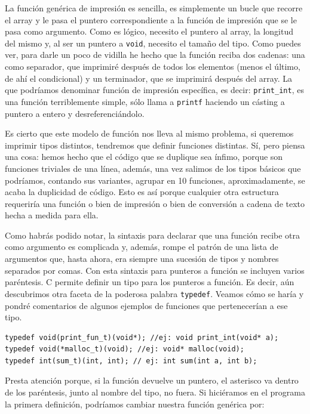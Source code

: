 \documentclass[a4paper]{article}
\begin{document}
La función genérica de impresión es sencilla, es simplemente un bucle que
recorre el array y le pasa el puntero correspondiente a la función de impresión
que se le pasa como argumento. Como es lógico, necesito el puntero al array,
la longitud del mismo y, al ser un puntero a \verb!void!, necesito el tamaño
del tipo. Como puedes ver, para darle un poco de vidilla he hecho que la
función reciba dos cadenas: una como separador, que imprimiré después de
todos los elementos (menos el último, de ahí el condicional) y un terminador,
que se imprimirá después del array. La que podríamos denominar función
de impresión específica, es decir: \verb!print_int!, es una función terriblemente
simple, sólo llama a \verb!printf! haciendo un cásting a puntero a entero
y desreferenciándolo.

Es cierto que este modelo de función nos lleva al mismo problema, si
queremos imprimir tipos distintos, tendremos que definir funciones distintas.
Sí, pero piensa una cosa: hemos hecho que el código que se duplique sea ínfimo,
porque son funciones triviales de una línea, además, una vez salimos de los
tipos básicos que podríamos, contando sus variantes, agrupar en 10 funciones,
aproximadamente, se acaba la duplicidad de código. Esto es así porque cualquier
otra estructura requeriría una función o bien de impresión o bien de conversión
a cadena de texto hecha a medida para ella.

Como habrás podido notar, la sintaxis para declarar que una función recibe
otra como argumento es complicada y, además, rompe el patrón de una lista
de argumentos que, hasta ahora, era siempre una sucesión de tipos y nombres
separados por comas. Con esta sintaxis para punteros a función se
incluyen varios paréntesis. C permite definir un tipo para los punteros
a función. Es decir, aún descubrimos otra faceta de la poderosa palabra
\verb!typedef!. Veamos cómo se haría y pondré comentarios de algunos ejemplos
de funciones que pertenecerían a ese tipo.

\noindent
\begin{minipage}[H]{\linewidth}
\mbox{}
\begin{lstlisting}[style=C,
caption={Definición de tipos puntero a función},
label={lst:functionPointerTypedef}]
typedef void(print_fun_t)(void*); //ej: void print_int(void* a);
typedef void(*malloc_t)(void); //ej: void* malloc(void);
typedef int(sum_t)(int, int); // ej: int sum(int a, int b);
\end{lstlisting}
\end{minipage}
Presta atención porque, si la función devuelve un puntero, el asterisco va
dentro de los paréntesis, junto al nombre del tipo, no fuera. Si hiciéramos en
el programa la primera definición, podríamos cambiar nuestra función genérica
por:
\end{document}
